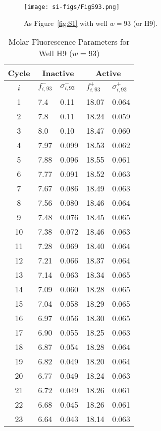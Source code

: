                 \begin{figure}
                    \centering
                    \texttt{[image: si-figs/FigS93.png]}
                    \caption{
                        As Figure~\ref{fig:S1} with well $w=93$ (or H9).
                    }
                \end{figure}
                \clearpage
    \begin{table}
        \caption{Molar Fluorescence Parameters for Well H9 ($w=93$)}
        \centering
        \begin{tabular}{c|ll|ll}
            Cycle & \multicolumn{2}{c|}{Inactive} & \multicolumn{2}{c}{Active} \\
            \hline
            $i$ & $f_{i,93}^{-}$ & $\sigma_{i,93}^{-}$ &  $f_{i,93}^{+}$ & $\sigma_{i,93}^{+}$ \\
            \hline
    1 & 7.4 & 0.11 & 18.07 & 0.064 \\
2 & 7.8 & 0.11 & 18.24 & 0.059 \\
3 & 8.0 & 0.10 & 18.47 & 0.060 \\
4 & 7.97 & 0.099 & 18.53 & 0.062 \\
5 & 7.88 & 0.096 & 18.55 & 0.061 \\
6 & 7.77 & 0.091 & 18.52 & 0.063 \\
7 & 7.67 & 0.086 & 18.49 & 0.063 \\
8 & 7.56 & 0.080 & 18.46 & 0.064 \\
9 & 7.48 & 0.076 & 18.45 & 0.065 \\
10 & 7.38 & 0.072 & 18.46 & 0.063 \\
11 & 7.28 & 0.069 & 18.40 & 0.064 \\
12 & 7.21 & 0.066 & 18.37 & 0.064 \\
13 & 7.14 & 0.063 & 18.34 & 0.065 \\
14 & 7.09 & 0.060 & 18.28 & 0.065 \\
15 & 7.04 & 0.058 & 18.29 & 0.065 \\
16 & 6.97 & 0.056 & 18.30 & 0.065 \\
17 & 6.90 & 0.055 & 18.25 & 0.063 \\
18 & 6.87 & 0.054 & 18.28 & 0.064 \\
19 & 6.82 & 0.049 & 18.20 & 0.064 \\
20 & 6.77 & 0.049 & 18.24 & 0.063 \\
21 & 6.72 & 0.049 & 18.26 & 0.061 \\
22 & 6.68 & 0.045 & 18.26 & 0.061 \\
23 & 6.64 & 0.043 & 18.14 & 0.063 \\

\end{tabular}
\end{table}
